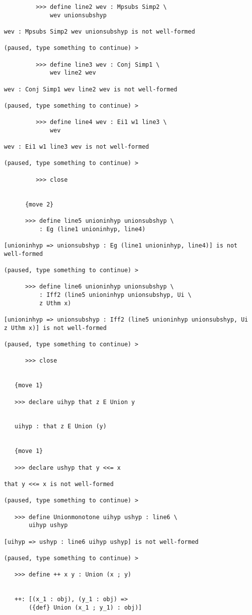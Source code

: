 \documentclass[12pt]{article}
\begin{document}
\begin{verbatim}
         >>> define line2 wev : Mpsubs Simp2 \
             wev unionsubshyp

wev : Mpsubs Simp2 wev unionsubshyp is not well-formed

(paused, type something to continue) >

         >>> define line3 wev : Conj Simp1 \
             wev line2 wev

wev : Conj Simp1 wev line2 wev is not well-formed

(paused, type something to continue) >

         >>> define line4 wev : Ei1 w1 line3 \
             wev

wev : Ei1 w1 line3 wev is not well-formed

(paused, type something to continue) >

         >>> close


      {move 2}

      >>> define line5 unioninhyp unionsubshyp \
          : Eg (line1 unioninhyp, line4)

[unioninhyp => unionsubshyp : Eg (line1 unioninhyp, line4)] is not well-formed

(paused, type something to continue) >

      >>> define line6 unioninhyp unionsubshyp \
          : Iff2 (line5 unioninhyp unionsubshyp, Ui \
          z Uthm x)

[unioninhyp => unionsubshyp : Iff2 (line5 unioninhyp unionsubshyp, Ui z Uthm x)] is not well-formed

(paused, type something to continue) >

      >>> close


   {move 1}

   >>> declare uihyp that z E Union y


   uihyp : that z E Union (y)


   {move 1}

   >>> declare ushyp that y <<= x

that y <<= x is not well-formed

(paused, type something to continue) >

   >>> define Unionmonotone uihyp ushyp : line6 \
       uihyp ushyp

[uihyp => ushyp : line6 uihyp ushyp] is not well-formed

(paused, type something to continue) >

   >>> define ++ x y : Union (x ; y)


   ++: [(x_1 : obj), (y_1 : obj) => 
       ({def} Union (x_1 ; y_1) : obj)]



\end{verbatim}
\end{document}

